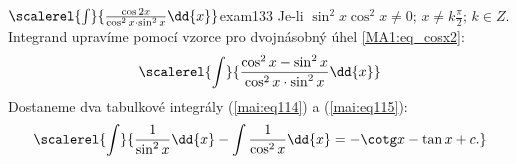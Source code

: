 % 
\begin{mathexam}{\(\scalerel{\int}{\frac{\cos2x}{\cos^2x\cdot\sin^2x}\dd{x}}\)}{exam133} 
  Je-li \(\sin^2x\cos^2x\neq0;\, x\neq k\frac{\pi}{2};\, k\in Z\). Integrand upravíme pomocí vzorce
  pro dvojnásobný úhel \ref{MA1:eq_cosx2}:
  \begin{equation*}
    \scalerel{\int}{\frac{\cos^2x-\sin^2x}{\cos^2x\cdot\sin^2x}\dd{x}}
  \end{equation*}
  Dostaneme dva tabulkové integrály (\ref{mai:eq114}) a (\ref{mai:eq115}):
  \begin{gather*}
    \scalerel{\int}{\frac{1}{\sin^2x}\dd{x} -\int\frac{1}{\cos^2x}\dd{x} = -\cotg x - \tan x + c.}
  \end{gather*}
\end{mathexam}